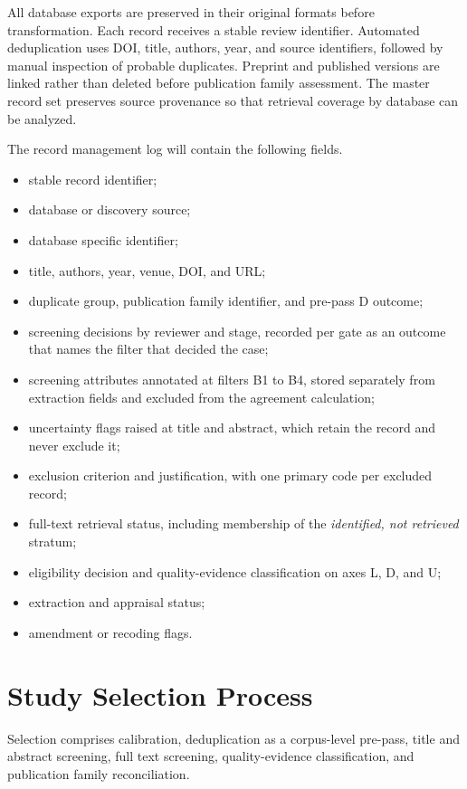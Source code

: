 All database exports are preserved in their original formats before transformation. Each record receives a stable review identifier. Automated deduplication uses DOI, title, authors, year, and source identifiers, followed by manual inspection of probable duplicates. Preprint and published versions are linked rather than deleted before publication family assessment. The master record set preserves source provenance so that retrieval coverage by database can be analyzed.

The record management log will contain the following fields.

\begin{itemize}
    \item stable record identifier;
    \item database or discovery source;
    \item database specific identifier;
    \item title, authors, year, venue, DOI, and URL;
    \item duplicate group, publication family identifier, and pre-pass D outcome;
    \item screening decisions by reviewer and stage, recorded per gate as an outcome that names the filter that decided the case;
    \item screening attributes annotated at filters B1 to B4, stored separately from extraction fields and excluded from the agreement calculation;
    \item uncertainty flags raised at title and abstract, which retain the record and never exclude it;
    \item exclusion criterion and justification, with one primary code per excluded record;
    \item full-text retrieval status, including membership of the \textit{identified, not retrieved} stratum;
    \item eligibility decision and quality-evidence classification on axes L, D, and U;
    \item extraction and appraisal status;
    \item amendment or recoding flags.
\end{itemize}

\section{Study Selection Process}
\label{sec:protocol_selection}

Selection comprises calibration, deduplication as a corpus-level pre-pass, title and abstract screening, full text screening, quality-evidence classification, and publication family reconciliation.

